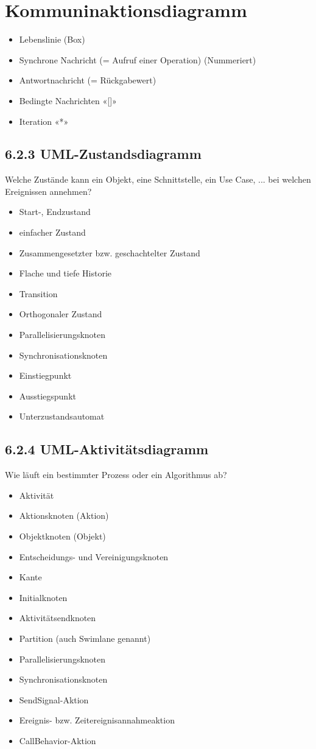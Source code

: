 \documentclass[10pt]{article}
\begin{document}
\section*{Kommuninaktionsdiagramm}
\begin{itemize}
  \item Lebenslinie (Box)
  \item Synchrone Nachricht (= Aufruf einer Operation) (Nummeriert)
  \item Antwortnachricht (= Rückgabewert)
  \item Bedingte Nachrichten «[]»
  \item Iteration «*»
\end{itemize}

\subsection*{6.2.3 UML-Zustandsdiagramm}
Welche Zustände kann ein Objekt, eine Schnittstelle, ein Use Case, ... bei welchen Ereignissen annehmen?

\begin{itemize}
  \item Start-, Endzustand
  \item einfacher Zustand
  \item Zusammengesetzter bzw. geschachtelter Zustand
  \item Flache und tiefe Historie
  \item Transition
  \item Orthogonaler Zustand
  \item Parallelisierungsknoten
  \item Synchronisationsknoten
  \item Einstiegpunkt
  \item Ausstiegspunkt
  \item Unterzustandsautomat
\end{itemize}

\subsection*{6.2.4 UML-Aktivitätsdiagramm}
Wie läuft ein bestimmter Prozess oder ein Algorithmus ab?

\begin{itemize}
  \item Aktivität
  \item Aktionsknoten (Aktion)
  \item Objektknoten (Objekt)
  \item Entscheidungs- und Vereinigungsknoten
  \item Kante
  \item Initialknoten
  \item Aktivitätsendknoten
  \item Partition (auch Swimlane genannt)
  \item Parallelisierungsknoten
  \item Synchronisationsknoten
  \item SendSignal-Aktion
  \item Ereignis- bzw. Zeitereignisannahmeaktion
  \item CallBehavior-Aktion
\end{itemize}
\end{document}
